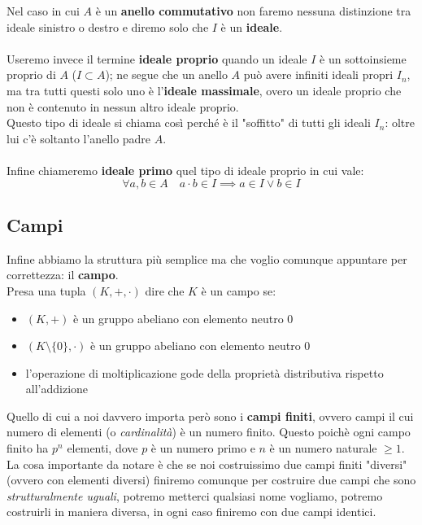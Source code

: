 Nel caso in cui \(A\) è un \textbf{anello commutativo} non faremo nessuna distinzione
tra ideale sinistro o destro e diremo solo che \(I\) è un \textbf{ideale}.
\\
\\
Useremo invece il termine \textbf{ideale proprio} quando un ideale \(I\) è un
sottoinsieme proprio di \(A\) (\( I \subset A\)); ne segue che un anello \(A\) può avere
infiniti ideali propri \(I_n\), ma tra tutti questi solo uno è l'\textbf{ideale massimale},
overo un ideale proprio che non è contenuto in nessun altro ideale proprio. \\
Questo tipo di ideale si chiama così perché è il "soffitto" di tutti gli ideali \(I_n\):
oltre lui c'è soltanto l'anello padre \(A\).
\\
\\
Infine chiameremo \textbf{ideale primo} quel tipo di ideale proprio in cui vale:
\[ \forall a,b \in A \quad a \cdot b \in I \implies a \in I \lor b \in I\]

\subsection{Campi}
Infine abbiamo la struttura più semplice ma che voglio comunque appuntare
per correttezza: il \textbf{campo}. \\
Presa una tupla \( (K, +, \cdot) \) dire che \(K\) è un campo se:
\begin{itemize}
  \item \( (K, +) \) è un gruppo abeliano con elemento neutro \(0\)
  \item \( (K \setminus \{0\}, \cdot) \) è un gruppo abeliano con elemento neutro \(0\)
  \item l'operazione di moltiplicazione gode della proprietà distributiva rispetto all'addizione
\end{itemize}
Quello di cui a noi davvero importa però sono i \textbf{campi finiti}, ovvero
campi il cui numero di elementi (o \emph{cardinalità}) è un numero finito. 
Questo poichè ogni campo finito ha \(p^n\) elementi, dove \(p\) è un numero primo
e \(n\) è un numero naturale \( \ge 1\). \\
La cosa importante da notare è che se noi costruissimo due campi finiti "diversi"
(ovvero con elementi diversi) finiremo comunque per costruire due campi che sono 
\emph{strutturalmente uguali}, potremo metterci qualsiasi nome vogliamo,
potremo costruirli in maniera diversa, in ogni caso finiremo con due campi 
identici.